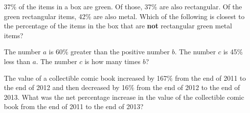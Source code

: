 37\% of the items in a box are green.  
Of those, 37\% are also rectangular.  
Of the green rectangular items, 42\% are also metal.  
Which of the following is closest to the percentage of the items in the box that are \textbf{not} rectangular green metal items?

\vspace{0.75em}


\vspace{2em}

\noindent\markforreview
\vspace{1em}

The number $a$ is 60\% greater than the positive number $b$.  
The number $c$ is 45\% less than $a$.  
The number $c$ is how many times $b$?

\vspace{0.75em}



\vspace{2em}

\noindent\markforreview
\vspace{1em}

The value of a collectible comic book increased by 167\% from the end of 2011 to the end of 2012  
and then decreased by 16\% from the end of 2012 to the end of 2013.  
What was the net percentage increase in the value of the collectible comic book from the end of 2011 to the end of 2013?

\vspace{0.75em}




\newpage

